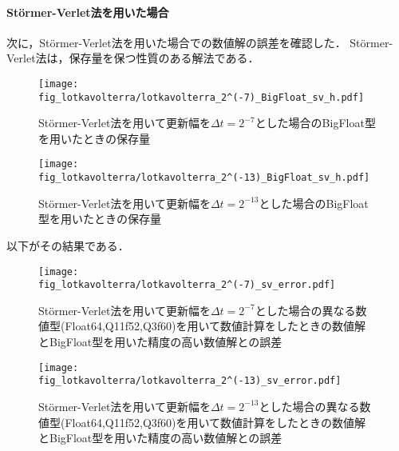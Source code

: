 \paragraph*{St\"ormer-Verlet法を用いた場合}
次に，St\"ormer-Verlet法を用いた場合での数値解の誤差を確認した．
St\"ormer-Verlet法は，保存量を保つ性質のある解法である．

\begin{figure}[H]
    \centering
    \begin{minipage}[b]{0.49\columnwidth}
        \centering
        \texttt{[image: fig\_lotkavolterra/lotkavolterra\_2^(-7)\_BigFloat\_sv\_h.pdf]}
        \caption{St\"ormer-Verlet法を用いて更新幅を$\Delta t = 2^{-7}$とした場合のBigFloat型を用いたときの保存量}        
    \end{minipage}
    \begin{minipage}[b]{0.49\columnwidth}
        \centering
        \texttt{[image: fig\_lotkavolterra/lotkavolterra\_2^(-13)\_BigFloat\_sv\_h.pdf]}
        \caption{St\"ormer-Verlet法を用いて更新幅を$\Delta t =  2^{-13}$とした場合のBigFloat型を用いたときの保存量}
    \end{minipage}
\end{figure}
以下がその結果である．

\begin{figure}[H]
    \centering
    \begin{minipage}[b]{0.49\columnwidth}
        \centering
        \texttt{[image: fig\_lotkavolterra/lotkavolterra\_2^(-7)\_sv\_error.pdf]}
        \caption{St\"ormer-Verlet法を用いて更新幅を$\Delta t = 2^{-7}$とした場合の異なる数値型(Float64,Q11f52,Q3f60)を用いて数値計算をしたときの数値解とBigFloat型を用いた精度の高い数値解との誤差}
        \label{fig:lotkavolterra_2^(-7)_sv_error}
    \end{minipage}
    \begin{minipage}[b]{0.49\columnwidth}
        \centering
        \texttt{[image: fig\_lotkavolterra/lotkavolterra\_2^(-13)\_sv\_error.pdf]}
        \caption{St\"ormer-Verlet法を用いて更新幅を$\Delta t =  2^{-13}$とした場合の異なる数値型(Float64,Q11f52,Q3f60)を用いて数値計算をしたときの数値解とBigFloat型を用いた精度の高い数値解との誤差}
        \label{fig:lotkavolterra_2^(-13)_sv_error}
    \end{minipage}
\end{figure}

